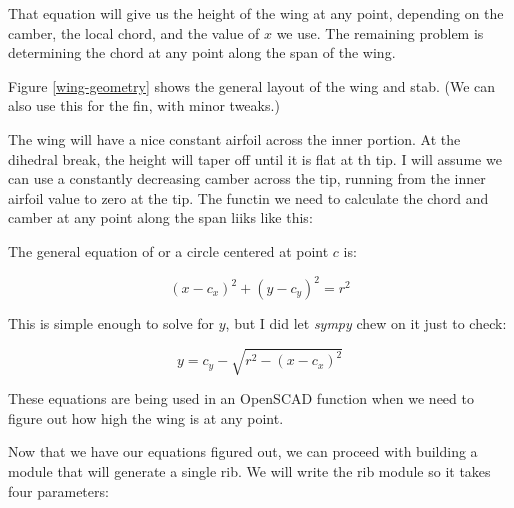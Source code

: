 That equation will give us the height of the wing at any point, depending on
the camber, the local chord, and the value of {$x$} we use. The remaining
problem is determining the chord at any point along the span of the wing.

Figure \ref{wing-geometry} shows the general layout of the wing and stab. (We
can also use this for the fin, with minor tweaks.)


The wing will have a nice constant airfoil across the inner portion. At the dihedral break, the height will taper off until it is flat at th tip. I will assume we can use a constantly decreasing camber across the tip, running from the inner airfoil value to zero at the tip. The functin we need to calculate the chord and camber at any point along the span liiks like this:

The general equation of or a circle centered at point {$c$} is:

\begin{equation}
  {(x - c_x)}^2 + {(y - c_y)}^2 = r^2
\end{equation}

This is simple enough to solve for {$y$}, but I did let {\it sympy} chew on it just to check:

\begin{equation}
  y = c_y - \sqrt{r^2 - (x - c_x)^{2}}
\end{equation}

These equations are being used in an OpenSCAD function when we need to figure out how high the wing is at any point.






Now that we have our equations figured out, we can proceed with building a
module that will generate a single rib. We will write the rib module so it
takes four parameters:

